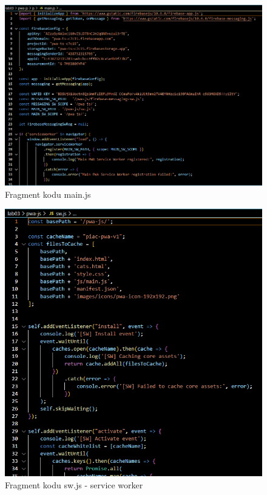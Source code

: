 \documentclass[a4paper,12pt]{article}
\begin{document}
\begin{figure}[H]
    \centering
    \includegraphics[width=1\textwidth]{images/main_js.png}
    \caption{Fragment kodu main.js}
\end{figure}

\begin{figure}[H]
    \centering
    \includegraphics[width=1\textwidth]{images/sw_js.png}
    \caption{Fragment kodu sw.js - service worker}
\end{figure}
\end{document}
